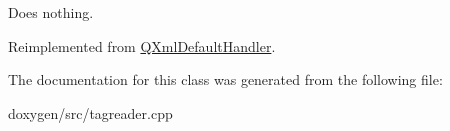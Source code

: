 Does nothing. 

Reimplemented from \mbox{\hyperlink{class_q_xml_default_handler_a0381a337b32a16d2ef2a8df9a29cb215}{Q\+Xml\+Default\+Handler}}.



The documentation for this class was generated from the following file\+:\begin{DoxyCompactItemize}
\item 
doxygen/src/tagreader.\+cpp\end{DoxyCompactItemize}
